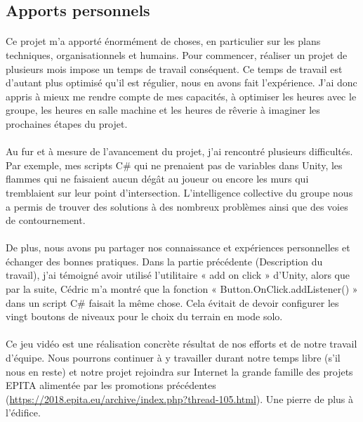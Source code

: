\documentclass[titlepage, 13px, a4paper]{report}
\begin{document}
\subsection{Apports personnels}
\paragraph*{} \hspace{0pt}
Ce projet m'a apporté énormément de choses, en particulier sur les plans techniques, 
organisationnels et humains. Pour commencer, réaliser un projet	
de plusieurs mois impose un temps de travail conséquent. Ce temps de travail est
d'autant plus optimisé qu'il est régulier, nous en avons fait l'expérience. J'ai donc
appris à mieux me rendre compte de mes capacités, à optimiser les heures avec le
groupe, les heures en salle machine et les heures de rêverie à imaginer les
prochaines étapes du projet. \\

\paragraph*{} \hspace{0pt}
Au fur et à mesure de l'avancement du projet, j'ai rencontré plusieurs difficultés.
Par exemple, mes scripts C\# qui ne prenaient pas de variables dans Unity, les
flammes qui ne faisaient aucun dégât au joueur ou encore les murs qui
tremblaient sur leur point d'intersection. L’intelligence collective du groupe nous 
a permis de trouver des solutions à des nombreux problèmes ainsi que des voies de contournement. \\

\paragraph*{} \hspace{0pt} 
De plus, nous avons pu partager nos connaissance et expériences personnelles et échanger des bonnes pratiques. 
Dans la partie précédente (Description du travail), j'ai témoigné avoir
utilisé l'utilitaire « add on click » d'Unity, alors que par la suite, Cédric m'a montré
que la fonction « Button.OnClick.addListener() » dans un script C\# faisait la même chose. Cela évitait de devoir
configurer les vingt boutons de niveaux pour le choix du terrain en mode solo. \\

\paragraph*{} \hspace{0pt} 
Ce jeu vidéo est une réalisation concrète résultat de nos efforts et de notre travail d’équipe. 
Nous pourrons continuer à y travailler durant notre temps libre (s’il nous en reste) 
et notre projet rejoindra sur Internet la grande famille des projets EPITA alimentée 
par les promotions précédentes (\url{https://2018.epita.eu/archive/index.php?thread-105.html}). 
Une pierre de plus à l’édifice. \\
\end{document}
